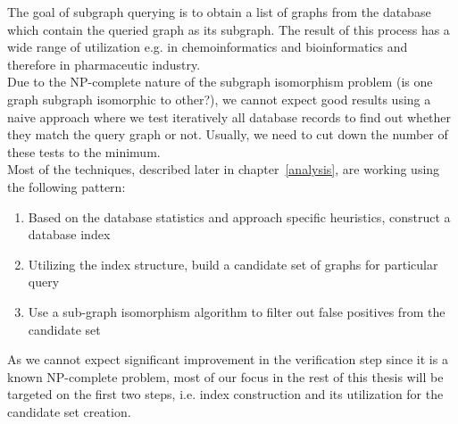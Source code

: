 The goal of subgraph querying is to obtain a list of graphs from the database which contain the queried graph as its subgraph. The result of this process has a wide range of utilization e.g. in chemoinformatics and bioinformatics and therefore in pharmaceutic industry.\\

Due to the NP-complete nature of the subgraph isomorphism problem (is one graph subgraph isomorphic to other?), we cannot expect good results using a naive approach where we test iteratively all database records to find out whether they match the query graph or not. Usually, we need to cut down the number of these tests to the minimum.\\


Most of the techniques, described later in chapter~\ref{analysis}, are working using the following pattern:
\begin{enumerate}
	\item Based on the database statistics and approach specific heuristics, construct a database index
	\item Utilizing the index structure, build a candidate set of graphs for particular query
	\item Use a sub-graph isomorphism algorithm to filter out false positives from the candidate set
\end{enumerate}


As we cannot expect significant improvement in the verification step since it is a known NP-complete problem, most of our focus in the rest of this thesis will be targeted on the first two steps, i.e. index construction and its utilization for the candidate set creation.